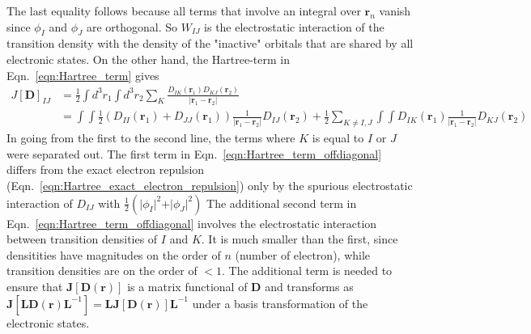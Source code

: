 \documentclass[journal=jpclcd,manuscript=letter]{achemso}
\newcommand\m[1]{\mathbf{#1}}
\renewcommand\vec[1]{\mathbf{#1}}
\begin{document}
The last equality follows because all terms that involve an integral over $\vec{r}_n$ vanish since $\phi_I$ and $\phi_J$ are orthogonal.
So $W_{IJ}$ is the electrostatic interaction of the transition density with the density of the "inactive" orbitals
that are shared by all electronic states. On the other hand, the Hartree-term in Eqn.~\ref{eqn:Hartree_term} gives
\begin{align}
 J[\m{D}]_{IJ} &= \frac{1}{2} \int d^3r_1 \int d^3r_2 \sum_K \frac{D_{IK}(\vec{r}_1) D_{KJ}(\vec{r}_2)}{\vert \vec{r}_1 - \vec{r}_2 \vert} \nonumber \\
 &= \int \int \frac{1}{2} 
  \left( D_{II}(\vec{r}_1) + D_{JJ}(\vec{r}_1) \right)
  \frac{1}{\vert \vec{r}_1 - \vec{r}_2 \vert}
  D_{IJ}(\vec{r}_2) +
  \frac{1}{2} \sum_{K \neq I,J} \int \int D_{IK}(\vec{r}_1) \frac{1}{\vert \vec{r}_1 - \vec{r}_2 \vert} D_{KJ}(\vec{r}_2)
  \label{eqn:Hartree_term_offdiagonal}
\end{align}
In going from the first to the second line, the terms where $K$ is equal to $I$ or $J$ were separated out.
The first term in Eqn.~\ref{eqn:Hartree_term_offdiagonal} differs from the exact electron repulsion (Eqn.~\ref{eqn:Hartree_exact_electron_repulsion})
only by the spurious electrostatic interaction of $D_{IJ}$ with $\frac{1}{2} (\vert \phi_I \vert^2 + \vert \phi_J \vert^2)$
The additional second term in Eqn.~\ref{eqn:Hartree_term_offdiagonal} involves the electrostatic interaction
between transition densities of $I$ and $K$. It is much smaller than the first, since densitities have magnitudes
on the order of $n$ (number of electron), while transition densities are on the order of $<1$.
The additional term is needed to ensure that $\m{J}[\m{D}(\vec{r})]$ is a matrix functional of $\m{D}$ and transforms as
$\m{J}[\m{L} \m{D}(\vec{r}) \m{L}^{-1}] = \m{L} \m{J}[\m{D}(\vec{r})] \m{L}^{-1}$ under a basis transformation of the electronic states.
\end{document}
